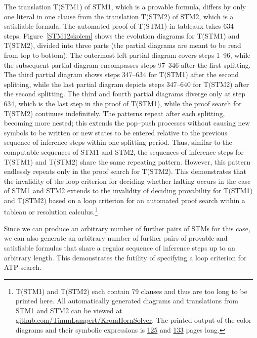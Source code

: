 \documentclass[%
  manuscript=article,   %
  year=2024,
  volume=77,
  doi=10.59203/zfn.77.694,
]{zfn}
\begin{document}
The translation T(STM1) of STM1, which is a provable formula, differs by only one literal in one clause from the translation T(STM2) of STM2, which is a satisfiable formula. The automated proof of T(STM1) in tableaux takes 634 steps. Figure~\ref{STM12skolem} shows the evolution diagrams for T(STM1) and T(STM2), divided into three parts (the partial diagrams are meant to be read from top to bottom). The outermost left partial diagram covers steps 1--96, while the subsequent partial diagram encompasses steps 97--346 after the first splitting. The third partial diagram shows steps 347--634 for T(STM1) after the second splitting, while the last partial diagram depicts steps 347--640 for T(STM2) after the second splitting. The third and fourth partial diagrams diverge only at step 634, which is the last step in the proof of T(STM1), while the proof search for T(STM2) continues indefinitely. The patterns repeat after each splitting, becoming more nested; this extends the pop--push processes without causing new symbols to be written or new states to be entered relative to the previous sequence of inference steps within one splitting period. Thus, similar to the computable sequences of STM1 and STM2, the sequences of inference steps for T(STM1) and T(STM2) share the same repeating pattern. However, this pattern endlessly repeats only in the proof search for T(STM2). This demonstrates that the invalidity of the loop criterion for deciding whether halting occurs in the case of STM1 and STM2 extends to the invalidity of deciding provability for T(STM1) and T(STM2) based on a loop criterion for an automated proof search within a tableau or resolution calculus.\footnote{T(STM1) and T(STM2) each contain 79 clauses and thus are too long to be printed here. All automatically generated diagrams and translations from STM1 and STM2 can be viewed at %
\href{https://github.com/TimmLampert/KromHornSolver}{github.com/TimmLampert/KromHornSolver}.%
\label{linkfoot} 
The printed output of the color diagrams and their symbolic expressions is 
\href{http://www2.cms.hu-berlin.de/newlogic/webMathematica/Logic/STM1.pdf}{125}
and 
\href{http://www2.cms.hu-berlin.de/newlogic/webMathematica/Logic/STM2.pdf}{133}
pages long.}

Since we can produce an arbitrary number of further pairs of STMs for this case, we can also generate an arbitrary number of further pairs of provable and satisfiable formulas that share a regular sequence of inference steps up to an arbitrary length. This demonstrates the futility of specifying a loop criterion for ATP-search.
\end{document}
